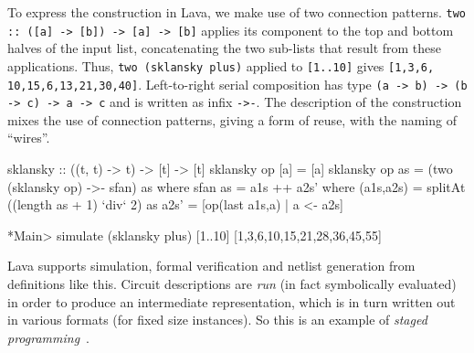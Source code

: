 To express the construction in Lava, we make use of two connection patterns.\newline
{\tt two :: ([a] -> [b]) -> [a] -> [b]} applies its component to
the top and bottom halves of the input list, concatenating the two sub-lists
that result from these applications.
Thus, {\tt two (sklansky plus)} applied to {\tt [1..10]} gives {\tt [1,3,6,} {\tt10,15,6,13,21,30,40]}.
Left-to-right serial composition has type
{\tt (a -> b) -> (b -> c) -> a -> c} and is written as infix {\tt ->-}.
The description of the construction mixes the use of connection patterns, giving a form of reuse, with the naming of ``wires''.

\begin{code}
sklansky :: ((t, t) -> t) -> [t] -> [t]
sklansky op [a] = [a]
sklansky op as = (two (sklansky op) ->- sfan) as
  where
    sfan as = a1s ++ a2s'
      where
        (a1s,a2s) = splitAt ((length as + 1) `div` 2) as
        a2s'      = [op(last a1s,a) | a <- a2s]

*Main> simulate (sklansky plus) [1..10]
[1,3,6,10,15,21,28,36,45,55]
\end{code}

Lava supports simulation, formal verification and netlist generation from definitions like this. Circuit descriptions are {\em run} (in fact symbolically evaluated) in order to produce an intermediate representation, which is in turn written out in various formats (for fixed size instances). So this is an example of {\em staged programming}~\cite{Taha03}.

